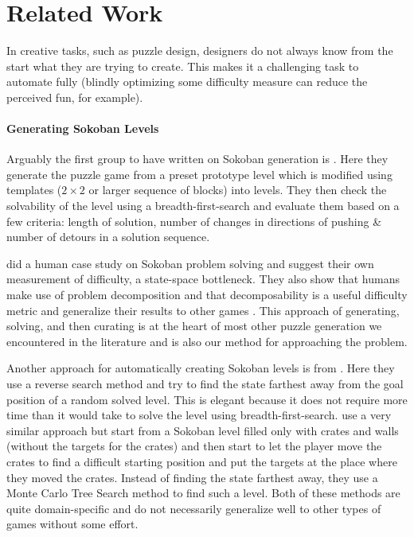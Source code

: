 
\setcounter{chapter}{1}

\chapter{Related Work}
In creative tasks, such as puzzle design, designers do not always know from the start what they are trying to create. This makes it a challenging task to automate fully (blindly optimizing some difficulty measure can reduce the perceived fun, for example).

\subsubsection{Generating Sokoban Levels}

Arguably the first group to have written on Sokoban generation is \cite{Science1996}. Here they generate the puzzle game from a preset prototype level which is modified using templates ($2 \times 2$ or larger sequence of blocks) into levels. They then check the solvability of the level using a breadth-first-search and evaluate them based on a few criteria: length of solution, number of changes in directions of pushing \& number of detours in a solution sequence.

\cite{Pelanek2011} did a human case study on Sokoban problem solving and suggest their own measurement of difficulty, a state-space bottleneck. They also show that humans make use of problem decomposition and that decomposability is a useful difficulty metric and generalize their results to other games \cite{Jaru}. This approach of generating, solving, and then curating is at the heart of most other puzzle generation we encountered in the literature and is also our method for approaching the problem.

Another approach for automatically creating Sokoban levels is from \cite{Taylor2011}. Here they use a reverse search method and try to find the state farthest away from the goal position of a random solved level. This is elegant because it does not require more time than it would take to solve the level using breadth-first-search. \cite{Kartal2015} use a very similar approach but start from a Sokoban level filled only with crates and walls (without the targets for the crates) and then start to let the player move the crates to find a difficult starting position and put the targets at the place where they moved the crates. Instead of finding the state farthest away, they use a Monte Carlo Tree Search method to find such a level. Both of these methods are quite domain-specific and do not necessarily generalize well to other types of games without some effort.

